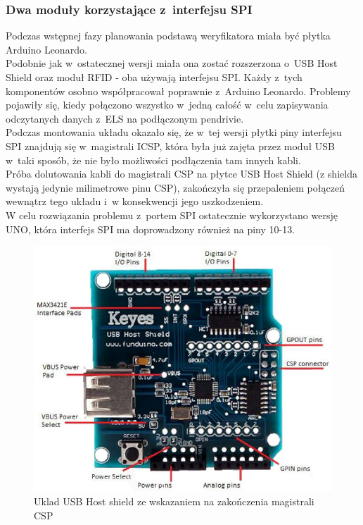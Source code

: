 \documentclass[declaration,shortabstract, mgr]{iithesis}
\begin{document}
\subsubsection{Dwa moduły korzystające z~interfejsu SPI}
\indent Podczas wstępnej fazy planowania podstawą weryfikatora miała być płytka Arduino Leonardo. \\
\indent Podobnie jak w~ostatecznej wersji miała ona zostać rozszerzona o~USB Host Shield oraz moduł RFID - oba używają interfejsu SPI. Każdy z~tych komponentów osobno współpracował poprawnie z~Arduino Leonardo. Problemy pojawiły się, kiedy połączono wszystko w~jedną całość w~celu zapisywania odczytanych danych z~ELS na podłączonym pendrivie. \\
\indent Podczas montowania układu okazało się, że w~tej wersji płytki piny interfejsu SPI znajdują się w~magistrali ICSP, która była już zajęta przez moduł USB w~taki sposób, że nie było możliwości podłączenia tam innych kabli. \\
\indent Próba dolutowania kabli do magistrali CSP na płytce USB Host Shield (z shielda wystają jedynie milimetrowe pinu CSP), zakończyła się przepaleniem połączeń wewnątrz tego układu i~w konsekwencji jego uszkodzeniem. \\
\indent W celu rozwiązania problemu z~portem SPI ostatecznie wykorzystano wersję UNO, która interfejs SPI ma doprowadzony również na piny 10-13. \\
\begin{figure}[h]
\caption{Uklad USB Host shield ze wskazaniem na zakończenia magistrali CSP}
\centering
\includegraphics[scale=0.3]{usb_host_shield.jpg}
\end{figure}
\end{document}
